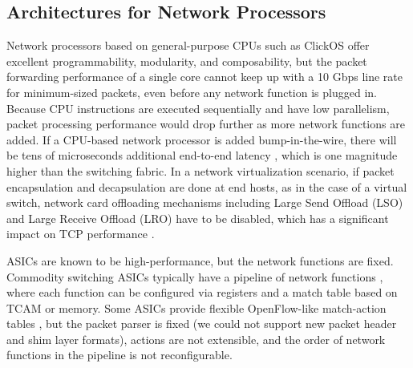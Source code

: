 
\subsection{Architectures for Network Processors}

Network processors based on general-purpose CPUs such as ClickOS \cite{martins2014clickos} offer excellent programmability, modularity, and composability, but the packet forwarding performance of a single core cannot keep up with a 10 Gbps line rate for minimum-sized packets, even before any network function is plugged in. Because CPU instructions are executed sequentially and have low parallelism, packet processing performance would drop further as more network functions are added. If a CPU-based network processor is added bump-in-the-wire, there will be tens of microseconds additional end-to-end latency \cite{martins2014clickos}, which is one magnitude higher than the switching fabric. In a network virtualization scenario, if packet encapsulation and decapsulation are done at end hosts, as in the case of a virtual switch, network card offloading mechanisms including Large Send Offload (LSO) and Large Receive Offload (LRO) have to be disabled, which has a significant impact on TCP performance \cite{yoshino2008performance}.

ASICs are known to be high-performance, but the network functions are fixed. Commodity switching ASICs typically have a pipeline of network functions \cite{broadcomethernet}, where each function can be configured via registers and a match table based on TCAM or memory. Some ASICs provide flexible OpenFlow-like match-action tables \cite{broadcomopenflow}, but the packet parser is fixed (we could not support new packet header and shim layer formats), actions are not extensible, and the order of network functions in the pipeline is not reconfigurable.

